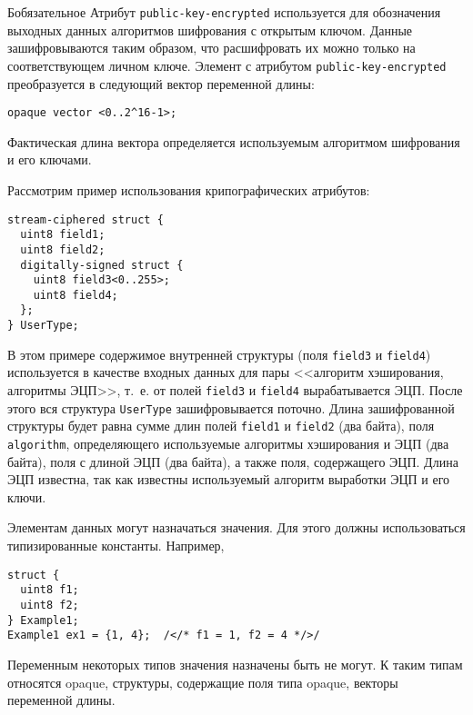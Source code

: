 \begin{appendix}{Б}{обязательное}
Атрибут \lstinline{public-key-encrypted} используется для обозначения выходных данных 
алгоритмов шифрования с открытым ключом. Данные зашифровываются таким 
образом, что расшифровать их можно только на соответствующем личном ключе. 
Элемент с атрибутом \lstinline{public-key-encrypted} преобразуется в 
следующий вектор переменной длины: 
\begin{lstlisting}
opaque vector <0..2^16-1>; 
\end{lstlisting}

Фактическая длина вектора определяется используемым алгоритмом шифрования 
и его ключами. 

Рассмотрим пример использования крипографических атрибутов:
\begin{lstlisting}
stream-ciphered struct {
  uint8 field1;
  uint8 field2;
  digitally-signed struct {
    uint8 field3<0..255>;
    uint8 field4;
  };
} UserType;
\end{lstlisting}

В этом примере содержимое внутренней структуры (поля \lstinline{field3} и
\lstinline{field4}) используется в качестве входных данных для пары
<<алгоритм хэширования, алгоритмы ЭЦП>>, т.~е. от полей \lstinline{field3}
и \lstinline{field4} вырабатывается ЭЦП. После этого вся структура
\lstinline{UserType} зашифровывается поточно. Длина
зашифрованной структуры будет равна сумме длин полей \lstinline{field1} и
\lstinline{field2} (два байта), поля \lstinline{algorithm}, определяющего
используемые алгоритмы хэширования и ЭЦП (два байта), поля с длиной ЭЦП
(два байта), а также поля, содержащего ЭЦП. Длина ЭЦП известна, так как
известны используемый алгоритм выработки ЭЦП и его ключи.

\label{SYNTAX.8}

Элементам данных могут назначаться значения. Для этого должны 
использоваться типизированные константы. Например, 
\begin{lstlisting}
struct {
  uint8 f1;
  uint8 f2;
} Example1;
Example1 ex1 = {1, 4};  /</* f1 = 1, f2 = 4 */>/
\end{lstlisting}

Переменным некоторых типов значения назначены быть не могут. К таким типам 
относятся opaque, структуры, содержащие поля типа opaque, векторы 
переменной длины. 

\end{appendix}

